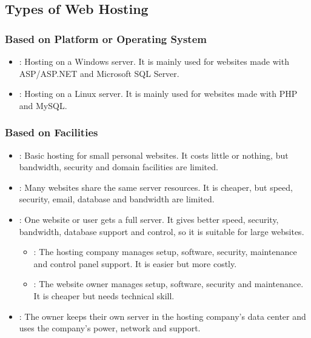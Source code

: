 \subsection{Types of Web Hosting}

\subsubsection{Based on Platform or Operating System}

\begin{itemize}
    \item {}: Hosting on a Windows server. It is mainly used for websites made with ASP/ASP.NET and Microsoft SQL Server.
    
    \item {}: Hosting on a Linux server. It is mainly used for websites made with PHP and MySQL.
\end{itemize}

\subsubsection{Based on Facilities}

\begin{itemize}
    \item {}: Basic hosting for small personal websites. It costs little or nothing, but bandwidth, security and domain facilities are limited.
    
    \item {}: Many websites share the same server resources. It is cheaper, but speed, security, email, database and bandwidth are limited.
    
    \item {}: One website or user gets a full server. It gives better speed, security, bandwidth, database support and control, so it is suitable for large websites.
    
    \begin{itemize}
        \item {}: The hosting company manages setup, software, security, maintenance and control panel support. It is easier but more costly.
        \item {}: The website owner manages setup, software, security and maintenance. It is cheaper but needs technical skill.
    \end{itemize}
    
    \item {}: The owner keeps their own server in the hosting company's data center and uses the company's power, network and support.
\end{itemize}

